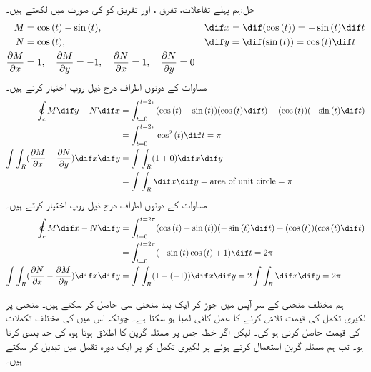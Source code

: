 
  حل:\quad ہم  پہلے تفاعلات، تفرق ، اور تفریق کو   کی صورت میں لکھتے ہیں۔ 
\begin{align*}
  M &= \cos{(t)} - \sin{(t)},  &&\dif x = \dif(\cos{(t)}) = -\sin{(t)}\dif t \\  N &= \cos{(t)},  && \dif y = \dif(\sin{(t)}) = \cos{(t)}\dif t \\  \frac{\partial M}{\partial x} &=1, \quad \frac{\partial M}{\partial y} = -1,\quad  \frac{\partial N}{\partial x} =1, \quad \frac{\partial N}{\partial y} = 0  
\end{align*}
 مساوات     کے  دونوں اطراف درج ذیل روپ اختیار کرتے ہیں۔  
\begin{align*}
     \oint_c M \dif y  - N \dif x &= \int_{t=0}^{t= 2\pi} (\cos{(t)} - \sin{(t)})(\cos{(t)} \dif t) - (\cos{(t)})(-\sin{(t)} \dif t) \\     &= \int_{t=0}^{t= 2\pi} \cos^2{(t)} \dif t = \pi \\     \int \int_R (\frac{\partial M}{\partial x} + \frac{\partial N}{\partial y}) \dif x \dif y &=  \int \int_R (1 + 0) \dif x \dif y \\     &= \int \int_R \dif x \dif y = \text{area of unit circle} = \pi 
\end{align*}
 مساوات    کے دونوں اطراف درج ذیل روپ اختیار کرتے ہیں۔ 
\begin{align*}
     \oint_c M \dif x  - N \dif y &= \int_{t=0}^{t= 2\pi} (\cos{(t)} - \sin{(t)})(-\sin{(t)} \dif t) + (\cos{(t)})(\cos{(t)} \dif t) \\     &= \int_{t=0}^{t= 2\pi} (-\sin{(t)}\cos{(t)} + 1) \dif t = 2\pi \\ \int \int_R (\frac{\partial N}{\partial x} - \frac{\partial M}{\partial y}) \dif x \dif y &=  \int \int_R (1 - (-1)) \dif x \dif y = 2 \int \int_R \dif x \dif y = 2\pi 
\end{align*}
 
 
   
 ہم مختلف منحنی  کے سر آپس میں جوڑ کر ایک بند منحنی سی حاصل کر سکتے ہیں۔ منحنی       پر لکیری تکمل کی قیمت تلاش کرنے کا عمل کافی لمبا ہو سکتا ہے۔  چونکہ اس میں کی  مختلف تکملات کی قیمت حاصل کرنی ہو                           کی۔  لیکن  اگر   خطہ   جس پر مسئلہ گرین کا اطلاق ہوتا ہو، کی حد بندی کرتا ہو۔ تب ہم مسئلہ گرین استعمال کرتے ہوئے   پر لکیری تکمل کو   پر ایک دورہ تقمل میں تبدیل کر سکتے ہیں۔    
 
